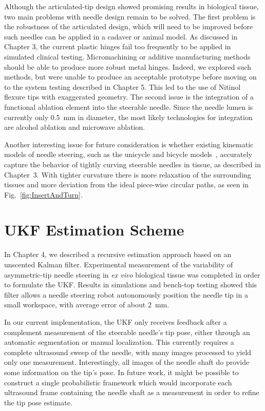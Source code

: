 Although the articulated-tip design showed promising results in biological tissue, two main problems with needle design remain to be solved. The first problem is the robustness of the articulated design, which will need to be improved before such needles can be applied in a cadaver or animal model. As discussed in Chapter 3, the current plastic hinges fail too frequently to be applied in simulated clinical testing. Micromachining or additive manufacturing methods should be able to produce more robust metal hinges. Indeed, we explored such methods, but were unable to produce an acceptable prototype before moving on to the system testing described in Chapter 5. This led to the use of Nitinol flexure tips with exaggerated geometry. The second issue is the integration of a functional ablation element into the steerable needle. Since the needle lumen is currently only 0.5~mm in diameter, the most likely technologies for integration are alcohol ablation and microwave ablation.  

Another interesting issue for future consideration is whether existing kinematic models of needle steering, such as the unicycle and bicycle models~\cite{Park2005,Webster2006}, accurately capture the behavior of tightly curving steerable needles in tissue, as described in Chapter~3. With tighter curvature there is more relaxation of the surrounding tissues and more deviation from the ideal piece-wise circular paths, as seen in Fig.~\ref{fig:InsertAndTurn}.

\section{UKF Estimation Scheme}
In Chapter 4, we described a recursive estimation approach based on an unscented Kalman filter. Experimental measurement of the variability of asymmetric-tip needle steering in \textit{ex vivo} biological tissue was completed in order to formulate the UKF. Results in simulations and bench-top testing showed this filter allows a needle steering robot autonomously position the needle tip in a small workspace, with average error of about 2~mm.

In our current implementation, the UKF only receives feedback after a complement measurement of the steerable needle's tip pose, either through an automatic segmentation or manual localization. This currently requires a complete ultrasound sweep of the needle, with many images processed to yield only one measurement. Interestingly, all images of the needle shaft do provide some information on the tip's pose. In future work, it might be possible to construct a single probabilistic framework which would incorporate each ultrasound frame containing the needle shaft as a measurement in order to refine the tip pose estimate.

